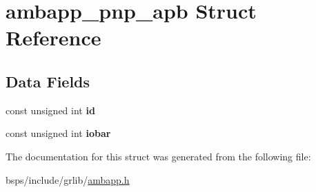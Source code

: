 \hypertarget{structambapp__pnp__apb}{}\section{ambapp\+\_\+pnp\+\_\+apb Struct Reference}
\label{structambapp__pnp__apb}
\subsection*{Data Fields}
\begin{DoxyCompactItemize}
\item 
\mbox{\label{structambapp__pnp__apb_a74d8e964920333a8ec5980bc9976b747}} 
const unsigned int {\bfseries id}
\item 
\mbox{\label{structambapp__pnp__apb_a890a75a1f962dc0f7ddd69bee59eadfb}} 
const unsigned int {\bfseries iobar}
\end{DoxyCompactItemize}


The documentation for this struct was generated from the following file\+:\begin{DoxyCompactItemize}
\item 
bsps/include/grlib/\mbox{\hyperlink{ambapp_8h}{ambapp.\+h}}\end{DoxyCompactItemize}
